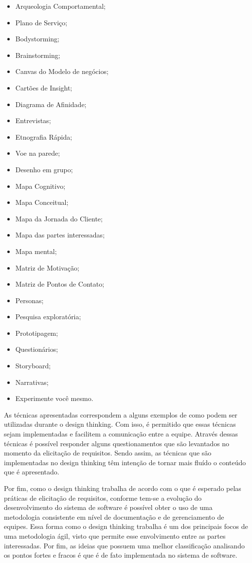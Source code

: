 \documentclass[a4paper,twoside]{article}
\begin{document}
\begin{itemize}
    \item Arqueologia Comportamental;
    \item Plano de Serviço;
    \item Bodystorming;
    \item Brainstorming;
    \item Canvas do Modelo de negócios;
    \item Cartões de Insight;
    \item Diagrama de Afinidade;
    \item Entrevistas;
    \item Etnografia Rápida;
    \item Voe na parede;
    \item Desenho em grupo;
    \item Mapa Cognitivo;
    \item Mapa Conceitual;
    \item Mapa da Jornada do Cliente;
    \item Mapa  das partes interessadas;
    \item Mapa mental;
    \item Matriz de Motivação;
    \item Matriz de Pontos de Contato;
    \item Personas;
    \item Pesquisa exploratória;
    \item Prototipagem;
    \item Questionários;
    \item Storyboard;
    \item Narrativas;
    \item Experimente você mesmo.
    
\end{itemize}

As técnicas apresentadas correspondem a alguns exemplos de como podem ser utilizadas durante o design thinking. Com isso, é permitido que essas técnicas sejam implementadas e facilitem a comunicação entre  a equipe. Através dessas técnicas é possível responder alguns questionamentos que são levantados no momento da elicitação de requisitos. Sendo assim, as técnicas que são implementadas no design thinking têm intenção de tornar mais fluído o conteúdo que é apresentado.   

Por fim, como o design thinking trabalha de acordo com o que é esperado pelas práticas de elicitação de requisitos, conforme tem-se a evolução do desenvolvimento do sistema de software é possível obter o uso de uma metodologia consistente em nível de documentação e de gerenciamento de equipes. Essa forma como o design thinking trabalha é um dos principais focos de uma metodologia ágil, visto que permite esse envolvimento entre as partes interessadas. Por fim, as ideias que possuem uma melhor classificação analisando os pontos fortes e fracos é que é de fato implementada no sistema de software\cite{DBLP:journals/information/MartinsJCKPO19}.
\end{document}
